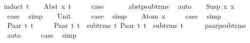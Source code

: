 \begin{isabellebody}
\isamarkupfalse%
{\isacharparenleft}{\kern0pt}induct\ t{\isacharparenright}{\kern0pt}\isanewline
\ \ \isamarkupfalse%
\ {\isacharparenleft}{\kern0pt}Abst\ x{}\ t{\isacharparenright}{\kern0pt}\isanewline
\ \ \isamarkupfalse%
\ \isamarkupfalse%
\ {\isacharquery}{\kern0pt}case\ \isanewline
\ \ \ \ \isamarkupfalse%
\ abst{\isacharunderscore}{\kern0pt}psub{\isacharunderscore}{\kern0pt}trms\ \isamarkupfalse%
\ auto\isanewline
{}\isamarkupfalse%
\isanewline
\ \ \isamarkupfalse%
\ {\isacharparenleft}{\kern0pt}Susp\ x{}\ x{}{\isacharparenright}{\kern0pt}\isanewline
\ \ \isamarkupfalse%
\ \isamarkupfalse%
\ {\isacharquery}{\kern0pt}case\ \isamarkupfalse%
\ simp\isanewline
{}\isamarkupfalse%
\isanewline
\ \ \isamarkupfalse%
\ Unit\isanewline
\ \ \isamarkupfalse%
\ \isamarkupfalse%
\ {\isacharquery}{\kern0pt}case\ \isamarkupfalse%
\ simp\isanewline
{}\isamarkupfalse%
\isanewline
\ \ \isamarkupfalse%
\ {\isacharparenleft}{\kern0pt}Atom\ x{\isacharparenright}{\kern0pt}\isanewline
\ \ \isamarkupfalse%
\ \isamarkupfalse%
\ {\isacharquery}{\kern0pt}case\ \isamarkupfalse%
\ simp\isanewline
{}\isamarkupfalse%
\isanewline
\ \ \isamarkupfalse%
\ {\isacharparenleft}{\kern0pt}Paar\ t{}\ t{}{\isacharparenright}{\kern0pt}\isanewline
\ \ \isamarkupfalse%
\ \isamarkupfalse%
\ {\isachardoublequoteopen}Paar\ t{}\ t{}\ {\isasymnotin}\ sub{\isacharunderscore}{\kern0pt}trms\ t{}{\isachardoublequoteclose}\ {\isachardoublequoteopen}Paar\ t{}\ t{}\ {\isasymnotin}\ sub{\isacharunderscore}{\kern0pt}trms\ t{}{\isachardoublequoteclose}\isanewline
\ \ \ \ \isamarkupfalse%
\ paar{\isacharunderscore}{\kern0pt}psub{\isacharunderscore}{\kern0pt}trms\ \isamarkupfalse%
\ auto\isanewline
\ \ \isamarkupfalse%
\ \isamarkupfalse%
\ {\isacharquery}{\kern0pt}case\ \isamarkupfalse%
\ simp\isanewline
{}\isamarkupfalse%
\isanewline
\ \ \isamarkupfalse%

\end{isabellebody}
